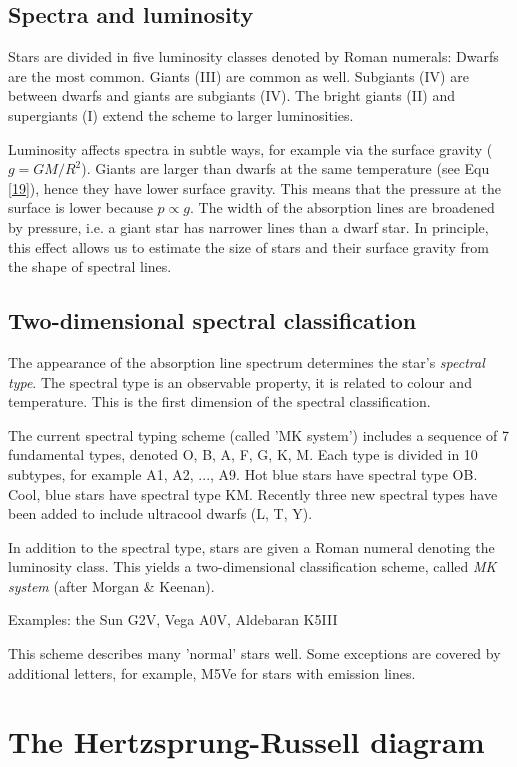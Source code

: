 \subsection{Spectra and luminosity}

Stars are divided in five luminosity classes denoted by Roman numerals: Dwarfs are the most common. Giants (III) are common as well. Subgiants (IV) are between dwarfs and giants are subgiants (IV). The bright giants (II) and supergiants (I) extend the scheme to larger luminosities. 

Luminosity affects spectra in subtle ways, for example via the surface gravity ($g = GM/R^2$). Giants are larger than dwarfs at the same temperature (see Equ \eqref{19}), hence they have lower surface gravity. This means that the pressure at the surface is lower because $p \propto g$. The width of the absorption lines are broadened by pressure, i.e. a giant star has narrower lines than a dwarf star. In principle, this effect allows us to estimate the size of stars and their surface gravity from the shape of spectral lines.

\subsection{Two-dimensional spectral classification}

The appearance of the absorption line spectrum determines the star's \textit{spectral type}. The spectral type is an observable property, it is related to colour and temperature. This is the first dimension of the spectral classification. 

The current spectral typing scheme (called 'MK system') includes a sequence of 7 fundamental types, denoted O, B, A, F, G, K, M. Each type is divided in 10 subtypes, for example A1, A2, ..., A9. Hot blue stars have spectral type OB. Cool, blue stars have spectral type KM. Recently three new spectral types have been added to include ultracool dwarfs (L, T, Y).

In addition to the spectral type, stars are given a Roman numeral denoting the luminosity class. This yields a two-dimensional classification scheme, called \textit{MK system} (after Morgan \& Keenan). 

Examples: the Sun G2V, Vega A0V, Aldebaran K5III

This scheme describes many 'normal' stars well. Some exceptions are covered by additional letters, for example, M5Ve for stars with emission lines.

\section{The Hertzsprung-Russell diagram}

